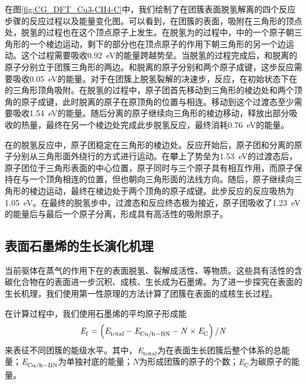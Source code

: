     在图\ref{fig:CG_DFT_Cu3-CH4-C}中，我们绘制了在团簇表面脱氢解离的四个反应步骤的反应过程以及能量变化图。可以看到，在团簇的表面，吸附在三角形的顶点处，脱氢的过程也在这个顶点原子上发生。在脱氢为的过程中，中的一个原子朝三角形的一个棱边运动，剩下的部分也在顶点原子的作用下朝三角形的另一个边运动。这个过程需要吸收\SI{0.92}{\electronvolt}的能量跨越势垒。当脱氢的过程完成后，和脱离的原子分别立于团簇三角形的两边。和脱离的原子分别和两个原子成键，这步反应需要吸收\SI{0.05}{\electronvolt}的能量。对于在团簇上脱氢裂解的决速步，反应，在初始状态下在的三角形顶角吸附。在脱氢的过程中，原子团首先移动到三角形的棱边处和两个顶角的原子成键，此时脱离的原子在原顶角的位置与相连。移动到这个过渡态至少需要吸收\SI{1.54}{\electronvolt}的能量。随后分离的原子继续向三角形的棱边移动，释放出部分吸收的热量，最终在另一个棱边处完成此步脱氢反应，最终消耗\SI{0.76}{\electronvolt}的能量。
    
    在的脱氢反应中，原子团稳定在三角形的棱边处。反应开始后，原子团和分离的原子分别从三角形面外绕行的方式进行运动。在攀上了势垒为\SI{1.53}{\electronvolt}的过渡态后，原子团位于三角形表面的中心位置，原子同时与三个原子具有相互作用，而原子保持在与一个顶角相连的位置，但也朝向三角形面的法线方向。随后，原子继续向三角形的棱边运动，最终在棱边处于两个顶角的原子成键。此步反应的反应吸热为\SI{1.05}{\electronvolt}。在最终的脱氢步中，过渡态和反应终态极为接近，原子团吸收了\SI{1.23}{\electronvolt}的能量后与最后一个原子分离，形成具有高活性的吸附原子。
    
    \subsection{表面石墨烯的生长演化机理}
    
    当前驱体在蒸气的作用下在的表面脱氢、裂解成活性、等物质。这些具有活性的含碳化合物在的表面进一步沉积、成核、生长成为石墨烯。为了进一步探究在表面的生长机理，我们使用第一性原理的方法计算了团簇在表面的成核生长过程。
    
    在计算过程中，我们使用石墨烯的平均原子形成能
    $$\it E_{\rm f}^{\rm } \it=\left(\it E_{\rm total}^{\rm } \it-\it E_{\rm Cu/h-BN}^{\rm } \it-N\times \it E_{\rm C}^{\rm } \it\right)\slash N$$
    来表征不同团簇的能级水平。其中，$\it E_{\rm total}^{\rm } \it$为在表面生长团簇后整个体系的总能量；$\it E_{\rm Cu/h-BN}^{\rm } \it$为单独衬底的能量；$N$为形成团簇的原子的个数；$\it E_{\rm C}^{\rm } \it$为碳原子的能量。

